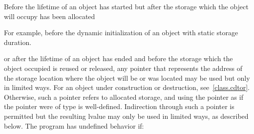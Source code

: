 \pnum
Before the lifetime of an object has started but after the storage which
the object will occupy has been allocated
\begin{footnote}
For example, before the dynamic initialization of
an object with static storage duration.
\end{footnote}
or after the lifetime of an object has ended and before the storage
which the object occupied is reused or released, any pointer that represents the address of
the storage location where the object will be or was located may be
used but only in limited ways.
For an object under construction or destruction, see~\ref{class.cdtor}.
Otherwise, such
a pointer refers to allocated
storage, and using the pointer as
if the pointer were of type  is
well-defined. Indirection through such a pointer is permitted but the resulting lvalue may only be used in
limited ways, as described below. The
program has undefined behavior if:
